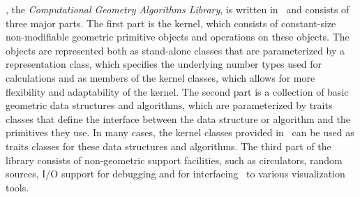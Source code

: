 \cgal, the {\em Computational Geometry Algorithms Library}, is written in 
\CC\ and consists of three major parts.
The first part is the kernel, which consists of constant-size non-modifiable 
geometric primitive objects and operations on these objects. 
The objects are represented both as stand-alone classes that are
parameterized by a representation class, which specifies
the underlying number types used for calculations and as members of the
kernel classes, which allows for more flexibility and adaptability of the 
kernel.
The second part is a collection of basic geometric data structures and
algorithms, which are parameterized by traits classes that define the 
interface between the data structure or algorithm and the primitives they use.
In many cases, the kernel classes provided in \cgal\ can be used as traits
classes for these data structures and algorithms.
The third part of the library consists of non-geometric support facilities, 
such as circulators, random sources, I/O support for debugging and for 
interfacing \cgal\ to various visualization tools.  
